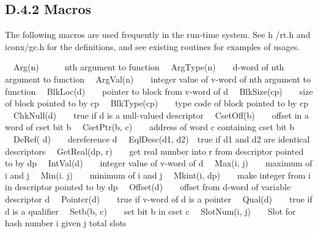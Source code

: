 \subsection{D.4.2 Macros}

The following macros are used frequently in the run-time system. See h
/rt.h and iconx/gc.h for the definitions, and see existing routines
for examples of usages.


\ \ Arg(n)\ \ \ \ \ \ nth argument to function\newline
\ \ ArgType(n)\ \ \ \ d-word of nth argument to function\newline
\ \ ArgVal(n)\ \ \ \ integer value of v-word of nth argument to function\newline
\ \ BlkLoc(d)\ \ \ \ pointer to block from v-word of d\newline
\ \ BlkSize(cp)\ \ \ \ size of block pointed to by cp\newline
\ \ BlkType(cp)\ \ \ \ type code of block pointed to by cp\newline
\ \ ChkNull(d)\ \ \ \ true if d is a null-valued descriptor\newline
\ \ CsetOff(b)\ \ \ \ offset in a word of cset bit b\newline
\ \ CsetPtr(b, c)\ \ \ \ address of word c containing cset bit b\newline
\ \ DeRef( d)\ \ \ \ dereference d\newline
\ \ EqlDesc(d1, d2)\ \ true if d1 and d2 are identical descriptors\newline
\ \ GetReal(dp, r)\ \ \ \ get real number into r from descriptor pointed to by dp\newline
\ \ IntVal(d)\ \ \ \ integer value of v-word of d\newline
\ \ Max(i, j)\ \ \ \ maximum of i and j\newline
\ \ Min(i. j)\ \ \ \ minimum of i and j\newline
\ \ Mkint(i, dp)\ \ \ \ make integer from i in descriptor pointed to by dp\newline
\ \ Offset(d)\ \ \ \ offset from d-word of variable descriptor d\newline
\ \ Pointer(d)\ \ \ \ true if v-word of d is a pointer\newline
\ \ Qual(d)\ \ \ \ true if d is a qualifier\newline
\ \ Setb(b, c)\ \ \ \ set bit b in cset c\newline
\ \ SlotNum(i, j)\ \ \ \ Slot for hash number i given j total slots\newline
